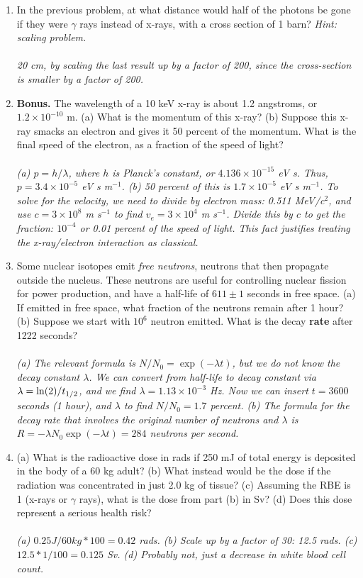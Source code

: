\documentclass[12pt,twocolumn]{article}
\begin{document}
\begin{enumerate}
\item In the previous problem, at what distance would half of the photons be gone if they were $\gamma$ rays instead of x-rays, with a cross section of 1 barn?  \textit{Hint: scaling problem.} \\ \\
\textit{20 cm, by scaling the last result up by a factor of 200, since the cross-section is smaller by a factor of 200.}
\item \textbf{Bonus.}  The wavelength of a 10 keV x-ray is about 1.2 angstroms, or $1.2 \times 10^{-10}$ m.  (a) What is the momentum of this x-ray? (b) Suppose this x-ray smacks an electron and gives it 50 percent of the momentum.  What is the final speed of the electron, as a fraction of the speed of light? \\ \\
\textit{(a) $p = h/\lambda$, where $h$ is Planck's constant, or $4.136\times 10^{-15}$ eV s.  Thus, $p = 3.4\times 10^{-5}$ eV s m$^{-1}$. (b) 50 percent of this is $1.7\times 10^{-5}$ eV s m$^{-1}$.  To solve for the velocity, we need to divide by electron mass: 0.511 MeV/c$^2$, and use $c = 3\times 10^8$ m s$^{-1}$ to find $v_e = 3\times 10^{4}$ m s$^{-1}$.  Divide this by $c$ to get the fraction: $10^{-4}$ or 0.01 percent of the speed of light.  This fact justifies treating the x-ray/electron interaction as classical.}
\item Some nuclear isotopes emit \textit{free neutrons}, neutrons that then propagate outside the nucleus.  These neutrons are useful for controlling nuclear fission for power production, and have a half-life of $611\pm 1$ seconds in free space.  (a) If emitted in free space, what fraction of the neutrons remain after 1 hour? (b) Suppose we start with $10^6$ neutron emitted.  What is the decay \textbf{rate} after 1222 seconds? \\ \\
\textit{(a) The relevant formula is $N/N_0 = \exp(-\lambda t)$, but we do not know the decay constant $\lambda$.  We can convert from half-life to decay constant via $\lambda = \ln(2)/t_{\rm 1/2}$, and we find $\lambda = 1.13 \times 10^{-3}$ Hz. Now we can insert $t = 3600$ seconds (1 hour), and $\lambda$ to find $N/N_0 = 1.7$ percent. (b) The formula for the decay rate that involves the original number of neutrons and $\lambda$ is $R = -\lambda N_0 \exp(-\lambda t) = 284$ neutrons per second.}
\item (a) What is the radioactive dose in rads if 250 mJ of total energy is deposited in the body of a 60 kg adult? (b) What instead would be the dose if the radiation was concentrated in just 2.0 kg of tissue? (c) Assuming the RBE is 1 (x-rays or $\gamma$ rays), what is the dose from part (b) in Sv? (d) Does this dose represent a serious health risk? \\ \\
\textit{(a) $0.25 J / 60 kg * 100 = 0.42$ rads. (b) Scale up by a factor of 30: 12.5 rads. (c) $12.5 * 1 / 100 = 0.125$ Sv.  (d) Probably not, just a decrease in white blood cell count.}
\end{enumerate}
\end{document}
